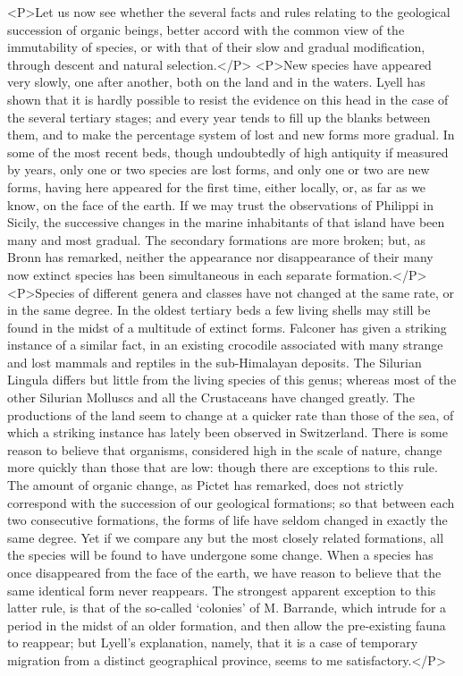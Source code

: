 <P>Let us now see whether the several facts and rules relating to the geological succession of organic beings, better accord with the common view of the immutability of species, or with that of their slow and gradual modification, through descent and natural selection.</P>
<P>New species have appeared very slowly, one after another, both on the land and in the waters. Lyell has shown that it is hardly possible to resist the evidence on this head in the case of the several tertiary stages; and every year tends to fill up the blanks between them, and to make the percentage system of lost and new forms more gradual. In some of the most recent beds, though undoubtedly of high antiquity if measured by years, only one or two species are lost forms, and only one or two are new forms, having here appeared for the first time, either locally, or, as far as we know, on the face of the earth. If we may trust the observations of Philippi in Sicily, the successive changes in the marine inhabitants of that island have been many and most gradual. The secondary formations are more broken; but, as Bronn has remarked, neither the appearance nor disappearance of their many now extinct species has been simultaneous in each separate formation.</P>
<P>Species of different genera and classes have not changed at the same rate, or in the same degree. In the oldest tertiary beds a few living shells may still be found in the midst of a multitude of extinct forms. Falconer has given a striking instance of a similar fact, in an existing crocodile associated with many strange and lost mammals and reptiles in the sub-Himalayan deposits. The Silurian Lingula differs but little from the living species of this genus; whereas most of the other Silurian Molluscs and all the Crustaceans have changed greatly. The productions of the land seem to change at a quicker rate than those of the sea, of which a striking instance has lately been observed in Switzerland. There is some reason to believe that organisms, considered high in the scale of nature, change more quickly than those that are low: though there are exceptions to this rule. The amount of organic change, as Pictet has remarked, does not strictly correspond with the succession of our geological formations; so that between each two consecutive formations, the forms of life have seldom changed in exactly the same degree. Yet if we compare any but the most closely related formations, all the species will be found to have undergone some change. When a species has once disappeared from the face of the earth, we have reason to believe that the same identical form never reappears. The strongest apparent exception to this latter rule, is that of the so-called `colonies' of M. Barrande, which intrude for a period in the midst of an older formation, and then allow the pre-existing fauna to reappear; but Lyell's explanation, namely, that it is a case of temporary migration from a distinct geographical province, seems to me satisfactory.</P>
